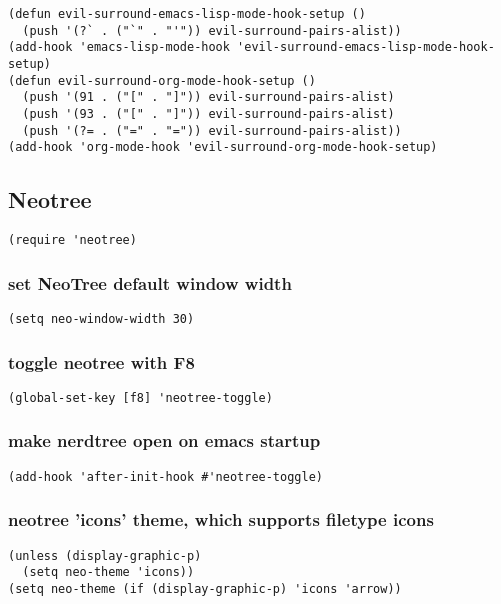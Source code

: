 \documentclass[11pt]{article}
\begin{document}
\begin{verbatim}
(defun evil-surround-emacs-lisp-mode-hook-setup ()
  (push '(?` . ("`" . "'")) evil-surround-pairs-alist))
(add-hook 'emacs-lisp-mode-hook 'evil-surround-emacs-lisp-mode-hook-setup)
(defun evil-surround-org-mode-hook-setup ()
  (push '(91 . ("[" . "]")) evil-surround-pairs-alist)
  (push '(93 . ("[" . "]")) evil-surround-pairs-alist)
  (push '(?= . ("=" . "=")) evil-surround-pairs-alist))
(add-hook 'org-mode-hook 'evil-surround-org-mode-hook-setup)
\end{verbatim}




\subsection*{Neotree}
\label{sec:orgafd6452}

\begin{verbatim}
(require 'neotree)
\end{verbatim}


\subsubsection*{set NeoTree default window width}
\label{sec:org7c6f4df}
\begin{verbatim}
(setq neo-window-width 30)
\end{verbatim}

\subsubsection*{toggle neotree with F8}
\label{sec:org827fbdb}
\begin{verbatim}
(global-set-key [f8] 'neotree-toggle)
\end{verbatim}


\subsubsection*{make nerdtree open on emacs startup}
\label{sec:org8a18b1d}
\begin{verbatim}
(add-hook 'after-init-hook #'neotree-toggle)
\end{verbatim}


\subsubsection*{neotree 'icons' theme, which supports filetype icons}
\label{sec:org81e8f34}
\begin{verbatim}
(unless (display-graphic-p)
  (setq neo-theme 'icons))
(setq neo-theme (if (display-graphic-p) 'icons 'arrow))
\end{verbatim}
\end{document}
